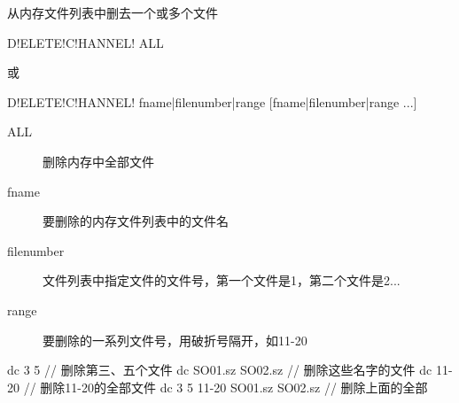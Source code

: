 \label{cmd:deletechannel}

从内存文件列表中删去一个或多个文件

\begin{SACSTX}
D!ELETE!C!HANNEL! ALL
\end{SACSTX}
或
\begin{SACSTX}
D!ELETE!C!HANNEL! fname|filenumber|range [fname|filenumber|range ...]
\end{SACSTX}

\begin{description}
\item [ALL] 删除内存中全部文件
\item [fname] 要删除的内存文件列表中的文件名
\item [filenumber] 文件列表中指定文件的文件号，第一个文件是1，第二个文件是2...
\item [range] 要删除的一系列文件号，用破折号隔开，如11-20
\end{description}

\begin{SACCode}
  dc 3 5                         // 删除第三、五个文件
  dc SO01.sz SO02.sz             // 删除这些名字的文件
  dc 11-20                       // 删除11-20的全部文件
  dc 3 5 11-20 SO01.sz SO02.sz   // 删除上面的全部
\end{SACCode}

